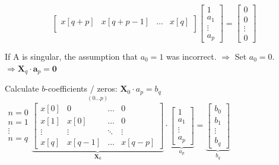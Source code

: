 \begin{aufzaehlung}
$$\begin{bmatrix}
    		x[q+p] & x[q+p-1] & \hdots & x[q] \\
		\end{bmatrix}
		\begin{bmatrix}
    		1 \\
    		a_1 \\
    		\vdots \\
    		a_p
		\end{bmatrix} = 
		\begin{bmatrix}
    		0 \\
    		0 \\
    		\vdots \\
    		0
		\end{bmatrix} 
		$$  \normalsize
		
		\vspace{-0.5cm}
		If A is singular, the assumption that $a_0 = 1$ was incorrect. $\Longrightarrow$ Set $a_0=0$.
		$ \Longrightarrow \bm X_q \cdot \bm a_p = \bm 0$
		
  		\item Calculate $b$-coefficients / zeros: $\bm X_0 \cdot a_p = b_q$ \small \hspace{0.5cm}
		$ \begin{matrix} n=0\\ n=1\\ \vdots\\ n=q \end{matrix} \overset{(0 \hdots p)}{\underbrace{\begin{bmatrix}
    		x[0] & 0 & \hdots & 0 \\
    		x[1] & x[0] & \hdots & 0 \\
    		\vdots & \vdots & \ddots & \vdots \\
    		x[q] & x[q-1] & \hdots & x[q-p]
		\end{bmatrix}  }_{\bm X_0}}\cdot \underbrace{\begin{bmatrix}
    		1 \\
    		a_1 \\
    		\vdots \\
    		a_p
		\end{bmatrix}  }_{a_p}= 	\underbrace{\begin{bmatrix}
	    		b_0 \\
	    		b_1 \\
	    		\vdots \\
	    		b_q
			\end{bmatrix}}_{b_q}$ \normalsize
			
	\end{aufzaehlung}
	
